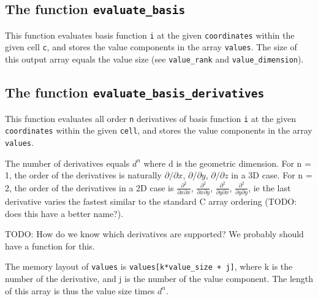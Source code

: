 
\subsection{The function \texttt{evaluate\_basis}}
This function evaluates basis function \texttt{i} at the given \texttt{coordinates}
within the given cell \texttt{c}, and stores the value components in the array \texttt{values}.
The size of this output array equals the value size (see \texttt{value\_rank} and \texttt{value\_dimension}).


\subsection{The function \texttt{evaluate\_basis\_derivatives}}
This function evaluates all order \texttt{n} derivatives of basis function \texttt{i}
at the given \texttt{coordinates} within the given \texttt{cell},
and stores the value components in the array \texttt{values}.

The number of derivatives equals $d^n$ where d is the geometric dimension.
For n = 1, the order of the derivatives is naturally
$\partial/\partial x$, $\partial/\partial y$, $\partial/\partial z$
in a 3D case.
For n = 2, the order of the derivatives in a 2D case is 
  $\frac{\partial^2}{\partial x\partial x}$,
  $\frac{\partial^2}{\partial x\partial y}$,
  $\frac{\partial^2}{\partial y\partial x}$,
  $\frac{\partial^2}{\partial y\partial y}$,
ie the last derivative varies the fastest similar to the standard C array ordering (TODO: does this have a better name?).

TODO: How do we know which derivatives are supported? We probably should have a function for this.

The memory layout of \texttt{values} is
\texttt{values[k*value\_size + j]},
where k is the number of the derivative,
and j is the number of the value component.
The length of this array is thus the value size times $d^n$.


